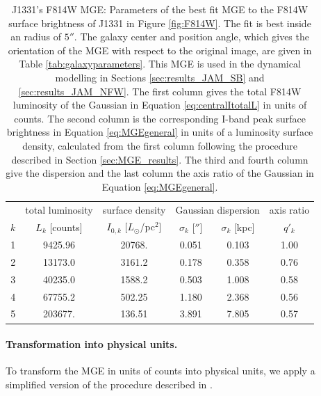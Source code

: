 \begin{table}
\centering
\caption{J1331's F814W MGE: Parameters of the best fit MGE to the F814W surface brightness of J1331 in Figure \ref{fig:F814W}. The fit is best inside an radius of $5''$. The galaxy center and position angle, which gives the orientation of the MGE with respect to the original image, are given in Table \ref{tab:galaxyparameters}. This MGE is used in the dynamical modelling in Sections \ref{sec:results_JAM_SB} and \ref{sec:results_JAM_NFW}.  The first column gives the total F814W luminosity of the Gaussian in Equation \ref{eq:centralItotalL} in units of counts. The second column is the corresponding I-band peak surface brightness in Equation \ref{eq:MGEgeneral} in units of a luminosity surface density, calculated from the first column following the procedure described in Section \ref{sec:MGE_results}. The third and fourth column give the dispersion and the last column the axis ratio of the Gaussian in Equation \ref{eq:MGEgeneral}.}
\begin{tabular}{cccccc}
\hline
 & total luminosity  & surface density & \multicolumn{2}{c}{Gaussian dispersion} & axis ratio\\
$k$  & $L_k$ [counts] & $I_{0,k}$ [$L_\odot$/pc$^2$] & $\sigma_k$ [$''$] & $\sigma_k$ [kpc] & $q'_k$\\\hline
1  &     9425.96 &      20768.  &  0.051   & 0.103  & 1.00\\
2  &    13173.0 &        3161.2 &  0.178   & 0.358  & 0.76\\
3  &    40235.0 &        1588.2 &  0.503   & 1.008  & 0.58\\
4  &    67755.2 &         502.25&  1.180   & 2.368  & 0.56\\
5  &    203677. &         136.51&  3.891   & 7.805  & 0.57\\\hline
\end{tabular}
\label{tab:MGEF814W}
\end{table}

\paragraph{Transformation into physical units.} To transform the MGE in units of counts into physical units, we apply a simplified version of the procedure described in \citet{Holtzman}.

